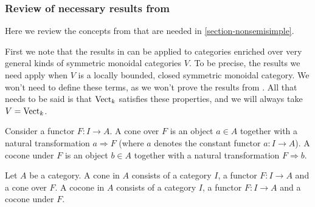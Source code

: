 % 
% 
% 


\subsubsection{Review of necessary results from \cite{kelly/basic-concepts-enriched}}\label{review_kelly}

Here we review the concepts from \cite{kelly/basic-concepts-enriched} that are
needed in \ref{section-nonsemisimple}.

First we note that the results in \cite{kelly/basic-concepts-enriched} can be
applied to categories enriched over very general kinds of symmetric monoidal
categories $V$. To be precise, the results we need apply when $V$ is a locally
bounded, closed symmetric monoidal category. We won't need to define these
terms, as we won't prove the results from
\cite{kelly/basic-concepts-enriched}. All that needs to be said is that
$\operatorname{Vect}_k$ satisfies these properties, and we will always take $V=\operatorname{Vect}_k$.

\begin{definition}

  \noindent Consider a functor $F:I\to A$. A cone over $F$ is an object $a\in
  A$ together with a natural transformation $a\Rightarrow F$ (where $a$
  denotes the constant functor $a:I\to A$). A cocone under $F$ is an object
  $b\in A$ together with a natural transformation $F\Rightarrow b$.
\end{definition}

\begin{definition}

  \noindent Let $A$ be a category. A cone in $A$ consists of a category $I$, a
  functor $F:I\to A$ and a cone over $F$. A cocone in $A$ consists of a
  category $I$, a functor $F:I\to A$ and a cocone under $F$.
\end{definition}

